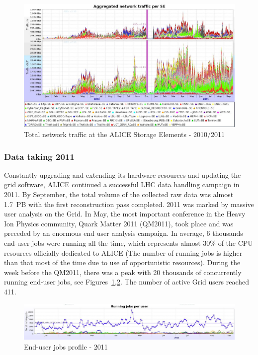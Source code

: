 \begin{figure}[htb] %
\centering
\includegraphics[width=13cm]{fig23.eps} %
\caption{Total network traffic at the ALICE Storage Elements -
2010/2011}\label{fig23}
\end{figure}


\subsubsection{Data taking 2011}
%
Constantly upgrading and extending its hardware resources and
updating the grid software, ALICE continued a successful LHC data
handling campaign in 2011. By September, the total volume of the
collected raw data was almost 1.7~PB with the first reconstruction
pass completed. 2011 was marked by massive user analysis on the
Grid. In May, the most important conference in the Heavy Ion Physics
community, Quark Matter 2011 (QM2011)\cite{QM}, took place and was
preceded by an enormous end user analysis campaign. In average, 6
thousands end-user jobs were running all the time, which represents
almost 30\% of the CPU resources officially dedicated to ALICE (The
number of running jobs is higher than that most of the time due to
use of opportunistic resources). During the week before the QM2011,
there was a peak with 20 thousands of concurrently running end-user
jobs, see Figures~\ref{fig23},\ref{fig24}. The number of active Grid
users reached 411.

\begin{figure}[htb] %
\centering
\includegraphics[width=13cm]{fig24.eps} %
\caption{End-user jobs profile - 2011}\label{fig24}
\end{figure}


